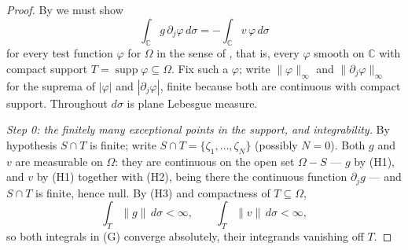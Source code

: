 \begin{proof}
By  we must show
\begin{equation}\tag{G}
  \int_{\mathbb{C}}g\,\partial_j\varphi\,d\sigma
  =-\int_{\mathbb{C}}v\,\varphi\,d\sigma
\end{equation}
for every test function $\varphi$ for $\Omega$ in the sense of
, that is, every $\varphi$ smooth on $\mathbb{C}$ with
compact support $T=\operatorname{supp}\varphi\subseteq\Omega$.  Fix such a
$\varphi$; write $\|\varphi\|_\infty$ and $\|\partial_j\varphi\|_\infty$ for the
suprema of $|\varphi|$ and $|\partial_j\varphi|$, finite because both are
continuous with compact support.  Throughout $d\sigma$ is plane Lebesgue
measure.

\emph{Step 0: the finitely many exceptional points in the support, and
integrability.}  By hypothesis $S\cap T$ is finite; write
$S\cap T=\{\zeta_1,\dots,\zeta_N\}$ (possibly $N=0$).  Both $g$ and $v$ are
measurable on $\Omega$: they are continuous on the open set $\Omega-S$ --- $g$
by (H1), and $v$ by (H1) together with (H2), being there the continuous
function $\partial_jg$ --- and $S\cap T$ is finite, hence null.  By (H3) and
compactness of $T\subseteq\Omega$,
\begin{equation}\tag{1}
  \int_{T}\|g\|\,d\sigma<\infty,\qquad \int_{T}\|v\|\,d\sigma<\infty ,
\end{equation}
so both integrals in (G) converge absolutely, their integrands vanishing off
$T$.


\end{proof}
